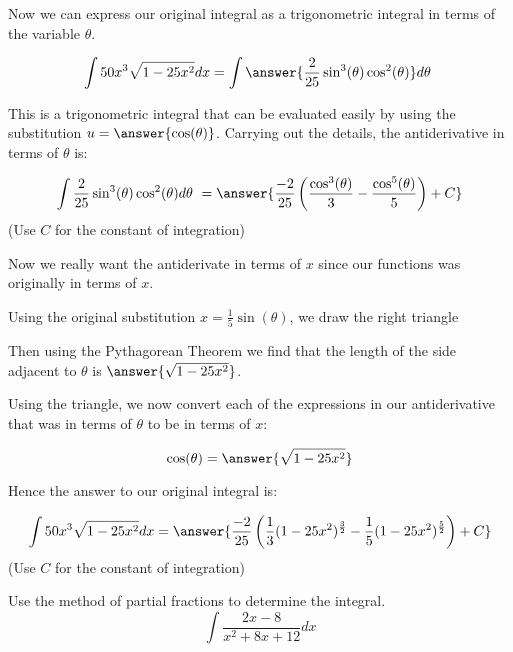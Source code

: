 \documentclass{ximera}
\begin{document}
\begin{exercise}
\begin{exercise}
\begin{exercise}
Now we can express our original integral as a trigonometric integral in terms of the variable $\theta$. 

\[
\int  50 x^{3} \sqrt{1-25x^{2}} dx= \int \answer{  \frac{2}{25} \sin^{3}(\theta) \cos^{2}(\theta)  } d\theta\
\]

This is a trigonometric integral that can be evaluated easily by using the substitution $u = \answer{\cos(\theta)}$.  Carrying out the details, the antiderivative in terms of $\theta$ is: 

\[
\int \frac{2}{25} \sin^{3}(\theta) \cos^{2}(\theta)   d\theta\ = \answer{ \frac{-2}{25}\left( \frac{\cos^{3}(\theta)}{3} -\frac{\cos^{5}(\theta)}{5} \right) + C}
\]
(Use $C$ for the constant of integration)


Now we really want the antiderivate in terms of $x$ since our functions was originally in terms of $x$. 

\begin{exercise}
Using the original substitution $x=\frac{1}{5}\sin(\theta)$, we draw the right triangle 

    \begin{image}
    \end{image}

Then using the Pythagorean Theorem we find that the
 length of the side adjacent to $\theta$ is $\answer{\sqrt{1-25x^{2}}}$. 

Using the triangle, we now convert each of the expressions in our antiderivative that was in terms of $\theta$ to be in terms of $x$:

\[
\cos(\theta)=\answer{\sqrt{1-25x^{2}}}
\]

\begin{exercise}
Hence the answer to our original integral is: 

\[
\int 50 x^{3} \sqrt{1-25x^{2}}  dx= \answer{ \frac{-2}{25} \left( \frac{1}{3}(1-25x^{2})^{\frac{3}{2}} - \frac{1}{5}(1-25x^{2})^{\frac{5}{2}}\right) + C }
\]
(Use $C$ for the constant of integration)
\begin{exercise}
Use the method of partial fractions to determine the integral.
\[
\int \frac{2x-8}{x^2+8x+12} dx
\]


\end{exercise}
\end{exercise}
\end{exercise}
\end{exercise}
\end{exercise}
\end{exercise}
\end{document}
